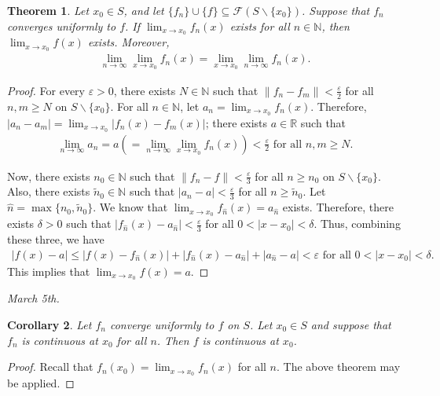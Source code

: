 \documentclass[15pt,a4paper]{book}
\newtheorem{theorem}{Theorem}[chapter]
\newtheorem{corollary}[theorem]{Corollary}
\theoremstyle{definition}
\newcommand{\abs}[1]{\left| #1 \right|} %
\newcommand{\N}{\mathbb{N}} %
\newcommand{\R}{\mathbb{R}} %
\newcommand{\cF}{\mathcal{F}}
\newcommand{\norm}[1]{\left\lVert#1\right\rVert}
\begin{document}
\begin{theorem}
    Let $x_{0} \in S$, and let $\{f_{n}\} \cup \{f\} \subseteq \cF(S \backslash \{x_{0}\})$. Suppose that $f_{n}$ converges uniformly to $f$. If $\lim_{x \to x_{0}} f_{n}(x)$ exists for all $n \in \N$, then $\lim_{x \to x_{0}} f(x)$ exists. Moreover,
    \begin{align*}
        \lim_{n \to \infty} \lim_{x \to x_{0}} f_{n}(x) = \lim_{x \to x_{0}} \lim_{n \to \infty} f_{n}(x).
    \end{align*}
\end{theorem}
\begin{proof}
    For every $\varepsilon > 0$, there exists $N \in \N$ such that $\norm{f_{n}-f_{m}} < \frac{\varepsilon}{2}$ for all $n,m \geq N$ on $S \backslash \{x_{0}\}$. For all $n \in \N$, let $a_{n} = \lim_{x \to x_{0}} f_{n}(x)$. Therefore, $\abs{a_{n}-a_{m}} = \lim_{x \to x_{0}} \abs{f_{n}(x)-f_{m}(x)}$; there exists $a \in \R$ such that
    \begin{align*}
        \lim_{n \to \infty} a_{n} = a \left( =\lim_{n \to \infty} \lim_{x \to x_{0}} f_{n}(x) \right) < \frac{\varepsilon}{2} \text{ for all } n,m \geq N.
    \end{align*}
    
    Now, there exists $n_{0} \in \N$ such that $\norm{f_{n}-f} < \frac{\varepsilon}{3}$ for all $n \geq n_{0}$ on $S \backslash \{x_{0}\}$. Also, there exists $\tilde{n}_{0} \in \N$ such that $\abs{a_{n}-a} < \frac{\varepsilon}{3}$ for all $n \geq \tilde{n}_{0}$. Let $\hat{n} = \max \{n_{0},\tilde{n}_{0}\}$. We know that $\lim_{x \to x_{0}} f_{\hat{n}}(x) = a_{\hat{n}}$ exists. Therefore, there exists $\delta > 0$ such that $\abs{f_{\hat{n}}(x)-a_{\hat{n}}} < \frac{\varepsilon}{3}$ for all $0 < \abs{x-x_{0}} < \delta$. Thus, combining these three, we have
    \begin{align*}
        \abs{f(x)-a} \leq \abs{f(x)-f_{\hat{n}}(x)} + \abs{f_{\hat{n}}(x)-a_{\hat{n}}} + \abs{a_{\hat{n}}-a} < \varepsilon \text{ for all } 0 < \abs{x-x_{0}} < \delta.
    \end{align*}
    This implies that $\lim_{x \to x_{0}} f(x) = a$.
\end{proof}

\textit{March 5th.}

\begin{corollary}
    Let $f_{n}$ converge uniformly to $f$ on $S$. Let $x_{0} \in S$ and suppose that $f_{n}$ is continuous at $x_{0}$ for all $n$. Then $f$ is continuous at $x_{0}$.
\end{corollary}
\begin{proof}
    Recall that $f_{n}(x_{0}) = \lim_{x \to x_{0}} f_{n}(x)$ for all $n$. The above theorem may be applied.
\end{proof}
\end{document}
